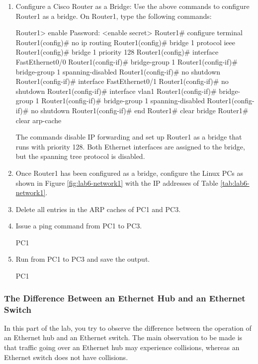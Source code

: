 \begin{enumerate}
	\item Configure a Cisco Router as a Bridge: Use the above commands to configure Router1 as a bridge. On Router1, type the following commands:
		\begin{cmdblock}
	Router1> enable Password: <enable secret>
	Router1# configure terminal
	Router1(config)# no ip routing
	Router1(config)# bridge 1 protocol ieee
	Router1(config)# bridge 1 priority 128
	Router1(config)# interface FastEthernet0/0
	Router1(config-if)# bridge-group 1
	Router1(config-if)# bridge-group 1 spanning-disabled
	Router1(config-if)# no shutdown
	Router1(config-if)# interface FastEthernet0/1
	Router1(config-if)# no shutdown
	Router1(config-if)# interface vlan1
	Router1(config-if)# bridge-group 1
	Router1(config-if)# bridge-group 1 spanning-disabled
	Router1(config-if)# no shutdown
	Router1(config-if)# end
	Router1# clear bridge
	Router1# clear arp-cache
		\end{cmdblock}
		The commands disable IP forwarding and set up Router1 as a bridge that runs with priority 128. Both Ethernet interfaces are assigned to the bridge, but the spanning tree protocol is disabled.
	\item Once Router1 has been configured as a bridge, configure the Linux PCs as shown in Figure \ref{fig:lab6-network1} with the IP addresses of Table \ref{tab:lab6-network1}.
	\item Delete all entries in the ARP caches of PC1 and PC3.
	\item Issue a ping command from PC1 to PC3.
		\begin{cmdblock}
	PC1%
		\end{cmdblock}
	\item Run  from PC1 to PC3 and save the output.
		\begin{cmdblock}
	PC1%
		\end{cmdblock}
\end{enumerate}

\begin{questions}
\end{questions}

\newpage
\subsubsection{The Difference Between an Ethernet Hub and an Ethernet Switch}
In this part of the lab, you try to observe the difference between the operation of an Ethernet hub and an Ethernet switch. The main observation to be made is that traffic going over an Ethernet hub may experience collisions, whereas an Ethernet switch does not have collisions.


